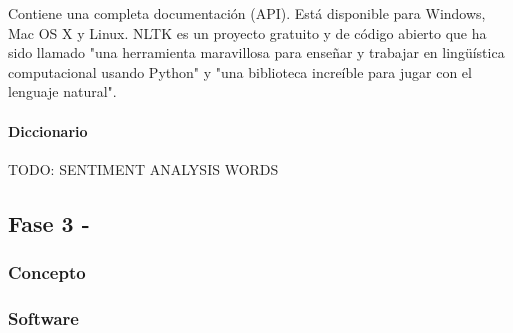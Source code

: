 \documentclass[../all.tex]{subfiles}
\begin{document}
			Contiene una completa documentación (API). Está disponible para Windows, Mac OS X y Linux. NLTK es un proyecto gratuito y de código abierto que ha sido llamado "una herramienta maravillosa para enseñar y trabajar en lingüística computacional usando Python" y "una biblioteca increíble para jugar con el lenguaje natural".
		\newpage		
        \paragraph{Diccionario}
            {\color{red} 
            TODO: SENTIMENT ANALYSIS WORDS
            }
\newpage
\subsection{Fase 3 - }
    \subsubsection{Concepto}

    \subsubsection{Software}
\end{document}
